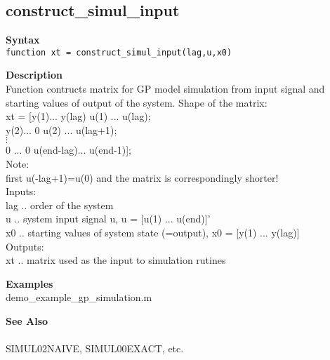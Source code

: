 \subsection*{construct\_simul\_input} \label{fun:construct_simul_input}


\textbf{Syntax}
\\ \texttt{function xt = construct\_simul\_input(lag,u,x0)}

\textbf{Description}
\\ Function contructs matrix for GP model simulation from input signal and
 starting values of output of the system. Shape of the matrix:
\\ xt = [y(1)... y(lag) u(1)      ... u(lag);
\\       y(2)... 0      u(2)      ... u(lag+1);
\\    $\vdots$
\\       0   ... 0      u(end-lag)... u(end-1)];
\\ Note:
\\first u(-lag+1)=u(0) and the matrix is correspondingly shorter!
\\ Inputs:
\\ lag .. order of the system
\\ u .. system input signal u, u = [u(1) ... u(end)]'
\\ x0 .. starting values of system state (=output),  x0 = [y(1) ... y(lag)]
\\ Outputs:
\\ xt .. matrix used as the input to simulation rutines

\textbf{Examples}
\\ demo\_example\_gp\_simulation.m

\textbf{See Also}
\\
\\ SIMUL02NAIVE, SIMUL00EXACT, etc.
